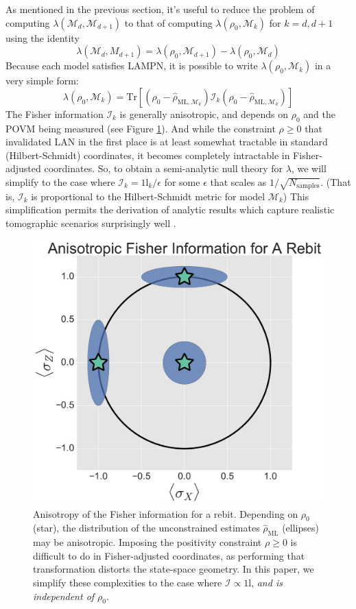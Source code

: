 \documentclass[aps,pra, twocolumn]{revtex4-1}
\newcommand{\M}{\mathcal{M}}
\newcommand{\Id}{\mathbb{I}}
\def\Id{1\!\mathrm{l}}
\newcommand{\rhohat}{\hat{\rho}}
\newcommand{\rhoML}[1]{\rhohat_{\scriptscriptstyle{\mathrm{ML},#1}}}
\begin{document}
As mentioned in the previous section, it's useful to reduce the problem of computing $\lambda(\M_{d}, \M_{d+1})$ to that of computing $\lambda(\rho_{0}, \M_{k})$ for $k = d, d+1$ using the identity
\[\lambda(\M_{d}, M_{d+1}) = \lambda(\rho_{0}, \M_{d+1}) - \lambda(\rho_{0}, \M_{d})\]
Because each model satisfies LAMPN, it is possible to write $\lambda(\rho_{0}, \M_{k})$ in a very simple form:
\[\lambda(\rho_{0}, \M_{k}) = \mathrm{Tr}[(\rho_{0} - \rhoML{\M_{k}})\mathcal{I}_{k}(\rho_{0} - \rhoML{\M_{k}})]\]
The Fisher information $\mathcal{I}_{k}$ is generally anisotropic, and depends on $\rho_{0}$ and the POVM being measured (see Figure \ref{fig:anisofi}). And while the constraint $\rho\geq0$ that invalidated LAN in the first place is at least somewhat tractable in standard (Hilbert-Schmidt) coordinates, it becomes completely intractable in Fisher-adjusted coordinates.  So, to obtain a semi-analytic null theory for $\lambda$, we will simplify to the case where   $\mathcal{I}_{k} = \Id_{k}/\epsilon $ for some $\epsilon$ that scales as $1/\sqrt{N_{\mathrm{samples}}}$. (That is, $\mathcal{I}_{k}$ is proportional to the Hilbert-Schmidt metric for model $\M_{k}$) This simplification permits the derivation of analytic results which capture realistic tomographic scenarios surprisingly well \cite{Smolin2012}.
\begin{figure}
\includegraphics[width=\columnwidth]{Images/Figure_2.pdf}
 \caption{Anisotropy of the Fisher information for a rebit. Depending on $\rho_{0}$ (star), the distribution of the unconstrained estimates $\hat{\rho}_{\mathrm{ML}}$ (ellipses) may be anisotropic. Imposing the positivity constraint $\rho \geq 0$ is difficult to do in Fisher-adjusted coordinates, as performing that transformation distorts the state-space geometry. In this paper, we simplify these complexities to the case where $\mathcal{I} \propto \Id$, \emph{and is independent of $\rho_{0}$}.}
\label{fig:anisofi}
\end{figure}
\end{document}
